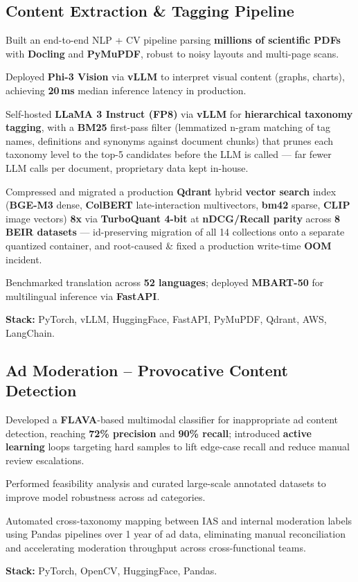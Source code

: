 \documentclass[letter,10pt]{article}
\begin{document}
\subsection{Content Extraction \& Tagging Pipeline}
\begin{zitemize}
\item Built an end-to-end NLP + CV pipeline parsing \textbf{millions of scientific PDFs} with \textbf{Docling} and \textbf{PyMuPDF}, robust to noisy layouts and multi-page scans.
\item Deployed \textbf{Phi-3 Vision} via \textbf{vLLM} to interpret visual content (graphs, charts), achieving \textbf{20\,ms} median inference latency in production.
\item Self-hosted \textbf{LLaMA 3 Instruct (FP8)} via \textbf{vLLM} for \textbf{hierarchical taxonomy tagging}, with a \textbf{BM25} first-pass filter (lemmatized n-gram matching of tag names, definitions and synonyms against document chunks) that prunes each taxonomy level to the top-5 candidates before the LLM is called --- far fewer LLM calls per document, proprietary data kept in-house.
\item Compressed and migrated a production \textbf{Qdrant} hybrid \textbf{vector search} index (\textbf{BGE-M3} dense, \textbf{ColBERT} late-interaction multivectors, \textbf{bm42} sparse, \textbf{CLIP} image vectors) \textbf{8x} via \textbf{TurboQuant 4-bit} at \textbf{nDCG/Recall parity} across \textbf{8 BEIR datasets} --- id-preserving migration of all 14 collections onto a separate quantized container, and root-caused \& fixed a production write-time \textbf{OOM} incident.
\item Benchmarked translation across \textbf{52 languages}; deployed \textbf{MBART-50} for multilingual inference via \textbf{FastAPI}.
\item \textbf{Stack:} PyTorch, vLLM, HuggingFace, FastAPI, PyMuPDF, Qdrant, AWS, LangChain.
\end{zitemize}

\subsection{Ad Moderation -- Provocative Content Detection}
\begin{zitemize}
\item Developed a \textbf{FLAVA}-based multimodal classifier for inappropriate ad content detection, reaching \textbf{72\% precision} and \textbf{90\% recall}; introduced \textbf{active learning} loops targeting hard samples to lift edge-case recall and reduce manual review escalations.
\item Performed feasibility analysis and curated large-scale annotated datasets to improve model robustness across ad categories.
\item Automated cross-taxonomy mapping between IAS and internal moderation labels using Pandas pipelines over 1 year of ad data, eliminating manual reconciliation and accelerating moderation throughput across cross-functional teams.
\item \textbf{Stack:} PyTorch, OpenCV, HuggingFace, Pandas.
\end{zitemize}
\end{document}
